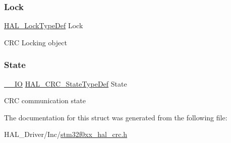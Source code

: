 \subsubsection{\texorpdfstring{Lock}{Lock}}
{\footnotesize\ttfamily \hyperlink{stm32f0xx__hal__def_8h_ab367482e943333a1299294eadaad284b}{H\+A\+L\+\_\+\+Lock\+Type\+Def} Lock}

C\+RC Locking object \mbox{\label{struct_c_r_c___handle_type_def_a5d303997b28e27531cbcff9d51113dc6}} 
\subsubsection{\texorpdfstring{State}{State}}
{\footnotesize\ttfamily \hyperlink{core__sc300_8h_aec43007d9998a0a0e01faede4133d6be}{\+\_\+\+\_\+\+IO} \hyperlink{group___c_r_c___exported___types_ga1021d6f27a072d45f6f3b233eefd8bbe}{H\+A\+L\+\_\+\+C\+R\+C\+\_\+\+State\+Type\+Def} State}

C\+RC communication state 

The documentation for this struct was generated from the following file\+:\begin{DoxyCompactItemize}
\item 
H\+A\+L\+\_\+\+Driver/\+Inc/\hyperlink{stm32f0xx__hal__crc_8h}{stm32f0xx\+\_\+hal\+\_\+crc.\+h}\end{DoxyCompactItemize}
